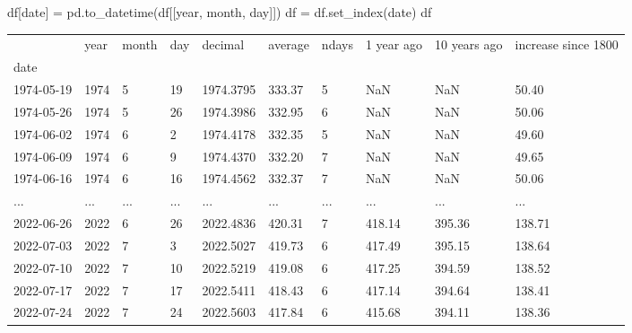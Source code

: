 \documentclass[
  letterpaper,
  DIV=11,
  numbers=noendperiod,
  oneside]{scrreprt}
\newenvironment{Shaded}{\begin{snugshade}}{\end{snugshade}}
\newcommand{\NormalTok}[1]{\textcolor[rgb]{0.00,0.23,0.31}{#1}}
\newcommand{\OperatorTok}[1]{\textcolor[rgb]{0.37,0.37,0.37}{#1}}
\newcommand{\StringTok}[1]{\textcolor[rgb]{0.13,0.47,0.30}{#1}}
\begin{document}
\begin{Shaded}
\begin{Highlighting}[]
\NormalTok{df[}\StringTok{\textquotesingle{}date\textquotesingle{}}\NormalTok{] }\OperatorTok{=}\NormalTok{ pd.to\_datetime(df[[}\StringTok{\textquotesingle{}year\textquotesingle{}}\NormalTok{, }\StringTok{\textquotesingle{}month\textquotesingle{}}\NormalTok{, }\StringTok{\textquotesingle{}day\textquotesingle{}}\NormalTok{]])}
\NormalTok{df }\OperatorTok{=}\NormalTok{ df.set\_index(}\StringTok{\textquotesingle{}date\textquotesingle{}}\NormalTok{)}
\NormalTok{df}
\end{Highlighting}
\end{Shaded}

\begin{longtable}[]{@{}llllllllll@{}}
\toprule()
& year & month & day & decimal & average & ndays & 1 year ago & 10 years
ago & increase since 1800 \\
date & & & & & & & & & \\
\midrule()
\endhead
1974-05-19 & 1974 & 5 & 19 & 1974.3795 & 333.37 & 5 & NaN & NaN &
50.40 \\
1974-05-26 & 1974 & 5 & 26 & 1974.3986 & 332.95 & 6 & NaN & NaN &
50.06 \\
1974-06-02 & 1974 & 6 & 2 & 1974.4178 & 332.35 & 5 & NaN & NaN &
49.60 \\
1974-06-09 & 1974 & 6 & 9 & 1974.4370 & 332.20 & 7 & NaN & NaN &
49.65 \\
1974-06-16 & 1974 & 6 & 16 & 1974.4562 & 332.37 & 7 & NaN & NaN &
50.06 \\
... & ... & ... & ... & ... & ... & ... & ... & ... & ... \\
2022-06-26 & 2022 & 6 & 26 & 2022.4836 & 420.31 & 7 & 418.14 & 395.36 &
138.71 \\
2022-07-03 & 2022 & 7 & 3 & 2022.5027 & 419.73 & 6 & 417.49 & 395.15 &
138.64 \\
2022-07-10 & 2022 & 7 & 10 & 2022.5219 & 419.08 & 6 & 417.25 & 394.59 &
138.52 \\
2022-07-17 & 2022 & 7 & 17 & 2022.5411 & 418.43 & 6 & 417.14 & 394.64 &
138.41 \\
2022-07-24 & 2022 & 7 & 24 & 2022.5603 & 417.84 & 6 & 415.68 & 394.11 &
138.36 \\
\bottomrule()
\end{longtable}
\end{document}
